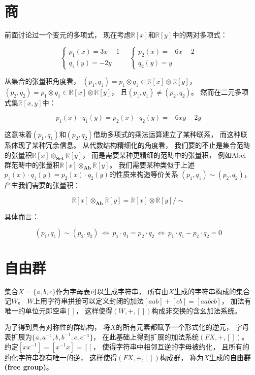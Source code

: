 \documentclass[10pt, openany]{book}
\begin{document}
\section{商}

前面讨论过一个变元的多项式，
现在考虑$\mathbb R[x]$和$\mathbb R[y]$中的两对多项式：

$$
\begin{cases}
p_1(x) = 3x + 1 \\
q_1(y) = - 2y
\end{cases} \quad
\begin{cases}
p_2(x) = -6x - 2 \\
q_2(y) = y
\end{cases}
$$

从集合的张量积角度看，
$(p_1,q_1) = p_1 \otimes q_1 \in \mathbb R[x] \otimes \mathbb R[y]$，
$(p_2,q_2) = p_1 \otimes q_1 \in \mathbb R[x] \otimes \mathbb R[y]$，
且$(p_1,q_1) \neq (p_2,q_2)$。
然而在二元多项式集$\mathbb R[x,y]$中：

$$
p_1(x) \cdot q_1(y) = p_2(x) \cdot q_2(y) = - 6xy - 2y 
$$

这意味着$(p_1,q_1)$和$(p_2,q_2)$借助多项式的乘法运算建立了某种联系，
而这种联系体现了某种冗余信息。
从代数结构精细化的角度看，
我们要的不止是集合范畴的张量积$\mathbb R[x] \otimes_\textbf{Set} \mathbb R[y]$，
而是需要某种更精细的范畴中的张量积，
例如Abel群范畴中的张量积$\mathbb R[x] \otimes_\textbf{Ab} \mathbb R[y]$。
我们需要某种类似于上述$p_1(x) \cdot q_1(y) = p_2(x) \cdot q_2(y) $的性质来构造等价关系
$(p_1,q_1) \sim (p_2,q_2)$，
产生我们需要的张量积：

$$
\mathbb R[x] \otimes_\textbf{Ab} \mathbb R[y]
= \mathbb R[x] \otimes \mathbb R[y]/\sim
$$

具体而言：

$$
(p_1,q_1) \sim (p_2,q_2) \ \Longleftrightarrow \ 
p_1 \cdot q_1 = p_2 \cdot q_2 \ \Longleftrightarrow \ 
p_1 \cdot q_1 - p_2 \cdot q_2 = 0
$$


\section{自由群}

集合$X=\{a,b,c\}$作为字母表可以生成字符串，
所有由$X$生成的字符串构成的集合记$W$。
$W$上用字符串拼接可以定义封闭的加法$[aab] + [cb] = [aabcb]$，
加法有唯一的单位元即空串$[]$，
这样使得$(W,+,[])$构成非交换的含幺加法系统。

为了得到具有对称性的群结构，
将$X$的所有元素都赋予一个形式化的逆元，
字母表扩展为$\{a,a^{-1},b,b^{-1},c,c^{-1}\}$，
在此基础上得到扩展的加法系统$(FX,+,[])$。
约定$[xx^{-1}] = [x^{-1}x] = []$，
使得字符串中相邻互逆的字母被约化，
且所有的约化字符串都有唯一的逆，
这样使得$(FX,+,[])$构成群，
称为$X$生成的\textbf{自由群(free group)}。
\end{document}
